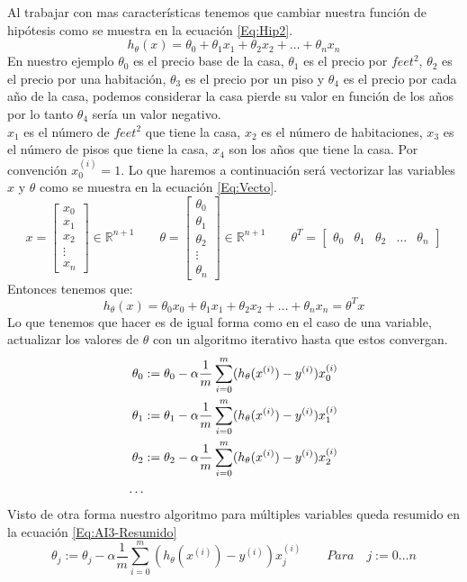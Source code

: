 \documentclass{report}
\begin{document}
Al trabajar con mas características tenemos que cambiar nuestra función de hipótesis como se muestra en la ecuación \ref{Eq:Hip2}.
\begin{equation}
	h_\theta(x)=\theta_0+\theta_1x_1+\theta_2x_2+\dots+\theta_nx_n
	\label{Eq:Hip2}
\end{equation}
En nuestro ejemplo $\theta_0$ es el precio base de la casa, $\theta_1$ es el precio por $feet^2$, $\theta_2$ es el precio por una habitación, $\theta_3$ es el precio por un piso y $\theta_4$ es el precio por cada año de la casa, podemos considerar la casa pierde su valor en función de los años por lo tanto $\theta_4$ sería un valor negativo.\\
$x_1$ es el número de $feet^2$ que tiene la casa, $x_2$ es el número de habitaciones, $x_3$ es el número de pisos que tiene la casa, $x_4$ son los años que tiene la casa. Por convención $x_0^{(i)}=1$. Lo que haremos a continuación será vectorizar las variables $x$ y $\theta$ como se muestra en la ecuación \ref{Eq:Vecto}.
\begin{equation}
x=\left[
\begin{array}{c}
	x_0\\x_1\\x_2\\\vdots\\x_n
\end{array}
\right]\in \mathbb{R}^{n+1}\qquad
\theta=\left[
\begin{array}{c}
\theta_0\\\theta_1\\\theta_2\\\vdots\\\theta_n
\end{array}
\right]\in \mathbb{R}^{n+1}\qquad
\theta^T=\left[
\begin{array}{ccccc}
\theta_0&\theta_1&\theta_2&\dots&\theta_n
\end{array}
\right]
\label{Eq:Vecto}
\end{equation}
Entonces tenemos que:
\begin{equation}
h_\theta(x)=\theta_0x_0+\theta_1x_1+\theta_2x_2+\dots+\theta_nx_n=\theta^Tx
\label{Eq:HipVecto}
\end{equation}
Lo que tenemos que hacer es de igual forma como en el caso de una variable, actualizar los valores de $\theta$ con un algoritmo iterativo hasta que estos convergan.
\begin{align}
\theta_0&:=\theta_0-\alpha\frac{1}{m}\sum_{i=0}^{m}(h_\theta(x^{(i)})-y^{(i)})x_0^{(i)}\label{Eq:AI3-1}\\
\theta_1&:=\theta_1-\alpha\frac{1}{m}\sum_{i=0}^{m}(h_\theta(x^{(i)})-y^{(i)})x_1^{(i)}\label{Eq:AI3-2}\\
\theta_2&:=\theta_2-\alpha\frac{1}{m}\sum_{i=0}^{m}(h_\theta(x^{(i)})-y^{(i)})x_2^{(i)}\label{Eq:AI3-3}\\
\dots\notag
\end{align}
Visto de otra forma nuestro algoritmo para múltiples variables queda resumido en la ecuación \ref{Eq:AI3-Resumido}
\begin{equation}
\theta_j:=\theta_j-\alpha\frac{1}{m}\sum_{i=0}^{m}(h_\theta(x^{(i)})-y^{(i)})x_j^{(i)} \qquad Para\quad j:=0\dots n
\label{Eq:AI3-Resumido}
\end{equation}
\end{document}
